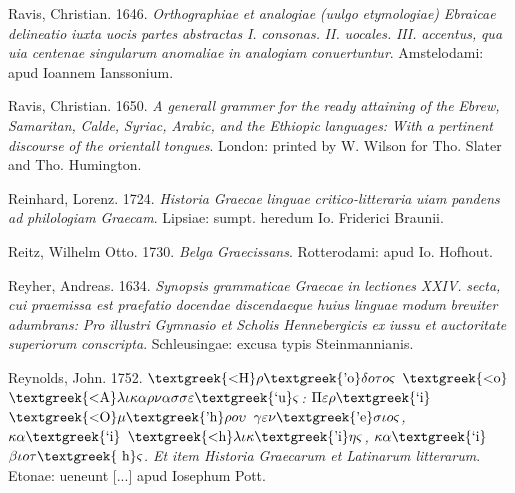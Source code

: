 Ravis, Christian. 1646. \textit{Orthographiae} \textit{et} \textit{analogiae} \textit{(uulgo} \textit{etymologiae)} \textit{Ebraicae} \textit{delineatio} \textit{iuxta} \textit{uocis} \textit{partes} \textit{abstractas} \textit{I.} \textit{consonas.} \textit{II.} \textit{uocales.} \textit{III.} \textit{accentus,} \textit{qua} \textit{uia} \textit{centenae} \textit{singularum} \textit{anomaliae} \textit{in} \textit{analogiam} \textit{conuertuntur}. Amstelodami: apud Ioannem Ianssonium.

Ravis, Christian. 1650. \textit{A} \textit{generall} \textit{grammer} \textit{for} \textit{the} \textit{ready} \textit{attaining} \textit{of} \textit{the} \textit{Ebrew,} \textit{Samaritan,} \textit{Calde,} \textit{Syriac,} \textit{Arabic,} \textit{and} \textit{the} \textit{Ethiopic} \textit{languages:} \textit{With} \textit{a} \textit{pertinent} \textit{discourse} \textit{of} \textit{the} \textit{orientall} \textit{tongues}. London: printed by W. Wilson for Tho. Slater and Tho. Humington.

Reinhard, Lorenz. 1724. \textit{Historia} \textit{Graecae} \textit{linguae} \textit{critico-litteraria} \textit{uiam} \textit{pandens} \textit{ad} \textit{philologiam} \textit{Graecam}. Lipsiae: sumpt. heredum Io. Friderici Braunii.

Reitz, Wilhelm Otto. 1730. \textit{Belga} \textit{Graecissans}. Rotterodami: apud Io. Hofhout.

Reyher, Andreas. 1634. \textit{Synopsis} \textit{grammaticae} \textit{Graecae} \textit{in} \textit{lectiones} \textit{XXIV.} \textit{secta,} \textit{cui} \textit{praemissa} \textit{est} \textit{praefatio} \textit{docendae} \textit{discendaeque} \textit{huius} \textit{linguae} \textit{modum} \textit{breuiter} \textit{adumbrans:} \textit{Pro} \textit{illustri} \textit{Gymnasio} \textit{et} \textit{Scholis} \textit{Hennebergicis} \textit{ex} \textit{iussu} \textit{et} \textit{auctoritate} \textit{superiorum} \textit{conscripta}. Schleusingae: excusa typis Steinmannianis.

Reynolds, John. 1752. \textit{$\text{\textgreek{<H}}\rho \text{\textgreek{'o}}\delta o\tau o\varsigma $ $\text{\textgreek{<o}}$ $\text{\textgreek{<A}}\lambda \iota \kappa \alpha \rho \nu \alpha \sigma \sigma \varepsilon \text{\textgreek{`u}}\varsigma $: $\Pi \varepsilon \rho \text{\textgreek{`i}}$ $\text{\textgreek{<O}}\mu \text{\textgreek{'h}}\rho o\upsilon $ $\gamma \varepsilon \nu \text{\textgreek{'e}}\sigma \iota o\varsigma $, $\kappa \alpha \text{\textgreek{`i}}$ $\text{\textgreek{<h}}\lambda \iota \kappa \text{\textgreek{'i}}\eta \varsigma $, $\kappa \alpha \text{\textgreek{`i}}$ $\beta \iota o\tau \text{\textgreek{~h}}\varsigma $. Et item Historia Graecarum et Latinarum litterarum}. Etonae: ueneunt [...] apud Iosephum Pott.

